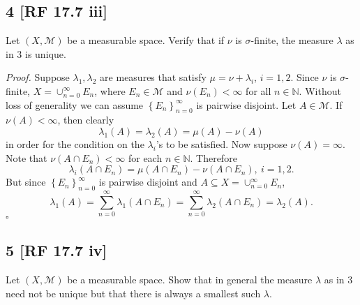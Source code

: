 \documentclass[12pt]{article}
\newcounter{ProofCounter}
\newenvironment{Proof}{\stepcounter{ProofCounter}\textit{Proof.}}{\hfill$\square$}
\begin{document}
\subsection*{4 [RF 17.7 iii]}
\begin{tcolorbox}
Let $(X,\mathcal{M})$ be a measurable space. Verify that if $\nu$ is $\sigma$-finite, the measure $\lambda$ as in 3 is unique.
\end{tcolorbox}

\begin{Proof}
Suppose $\lambda_{1}, \lambda_{2}$ are measures that satisfy $\mu = \nu + \lambda_{i}$, $i = 1,2$. Since $\nu$ is $\sigma$-finite, $X =
\cup_{n=0}^{\infty}E_{n}$, where $E_{n} \in \mathcal{M}$ and $\nu(E_{n}) < \infty$ for all $n \in \mathbb{N}$. Without loss of generality we can assume $\left\{ E_{n}
\right\}_{n=0}^{\infty}$ is pairwise disjoint. Let $A \in \mathcal{M}$. If $\nu(A) < \infty$, then clearly 
\[ \lambda_{1}(A) = \lambda_{2}(A) = \mu(A) - \nu(A) \] 
in order for the condition on the $\lambda_{i}$'s to be satisfied. Now suppose $\nu(A) = \infty$. Note that $\nu(A\cap E_{n}) < \infty$ 
for each $n \in \mathbb{N}$. Therefore 
\[ \lambda_{i}(A\cap E_{n}) = \mu(A\cap E_{n}) - \nu(A\cap E_{n}), \ i = 1,2. \]
But since $\left\{ E_{n} \right\}_{n=0}^{\infty}$ is pairwise disjoint and $A \subseteq X = \cup_{n=0}^{\infty}E_{n}$,
\[ \lambda_{1}(A) = \sum_{n=0}^{\infty}\lambda_{1}(A\cap E_{n}) = \sum_{n=0}^{\infty}\lambda_{2}(A\cap E_{n}) = \lambda_{2}(A). \]
\end{Proof}



\newpage 
\subsection*{5 [RF 17.7 iv]}
\begin{tcolorbox}
Let $(X,\mathcal{M})$ be a measurable space. Show that in general the measure $\lambda$ as in 3 need not be unique but that there is always a smallest
such $\lambda$.
\end{tcolorbox}
\end{document}

